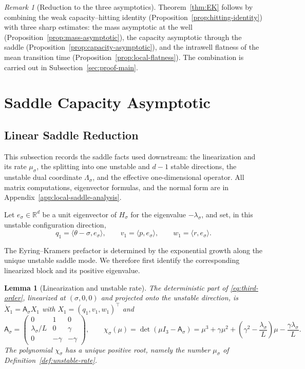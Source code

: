 \documentclass[11pt]{article}
\numberwithin{equation}{section}
\theoremstyle{plain}
\newtheorem{lemma}[theorem]{Lemma}
\theoremstyle{definition}
\theoremstyle{remark}
\newtheorem{remark}[theorem]{Remark}
\newcommand{\R}{\mathbb R}
\begin{document}
\begin{remark}[Reduction to the three asymptotics]
Theorem~\ref{thm:EK} follows by combining the weak capacity--hitting identity
(Proposition~\ref{prop:hitting-identity}) with three sharp estimates: the mass
asymptotic at the well (Proposition~\ref{prop:mass-asymptotic}), the capacity
asymptotic through the saddle (Proposition~\ref{prop:capacity-asymptotic}), and
the intrawell flatness of the mean transition time
(Proposition~\ref{prop:local-flatness}).  The combination is carried out in
Subsection~\ref{sec:proof-main}.
\end{remark}


\section{Saddle Capacity Asymptotic}
\label{sec:saddle-capacity}

\subsection{Linear Saddle Reduction}
\label{sec:saddle-reduction}

This subsection records the saddle facts used downstream: the
linearization and its rate $\mu_\sigma$, the splitting into one unstable and
$d-1$ stable directions, the unstable dual coordinate $\Lambda_\sigma$, and the
effective one-dimensional operator.  All matrix computations, eigenvector
formulas, and the normal form are in
Appendix~\ref{app:local-saddle-analysis}.

Let $e_\sigma\in\R^d$ be a unit eigenvector of $H_\sigma$ for the eigenvalue
$-\lambda_\sigma$, and set, in this unstable configuration direction,
\[
q_1=\langle\theta-\sigma,e_\sigma\rangle,\qquad
v_1=\langle p,e_\sigma\rangle,\qquad
w_1=\langle r,e_\sigma\rangle .
\]

The Eyring--Kramers prefactor is determined by the exponential
growth along the unique unstable saddle mode.  We therefore first identify
the corresponding linearized block and its positive eigenvalue.

\begin{lemma}[Linearization and unstable rate]
\label{lem:saddle-characteristic-polynomial}
The deterministic part of \eqref{eq:third-order}, linearized at
$(\sigma,0,0)$ and projected onto the unstable direction, is
$\dot X_1=\mathsf A_\sigma X_1$ with $X_1=(q_1,v_1,w_1)^\top$ and
\[
\mathsf A_\sigma=
\begin{pmatrix}
0&1&0\\
\lambda_\sigma/L&0&\gamma\\
0&-\gamma&-\gamma
\end{pmatrix},
\qquad
\chi_\sigma(\mu)=\det(\mu I_{3}-\mathsf A_\sigma)
=\mu^3+\gamma\mu^2+\left(\gamma^2-\frac{\lambda_\sigma}{L}\right)\mu
-\frac{\gamma\lambda_\sigma}{L}.
\]
The polynomial $\chi_\sigma$ has a unique positive root, namely the number
$\mu_\sigma$ of Definition~\ref{def:unstable-rate}.
\end{lemma}
\end{document}
